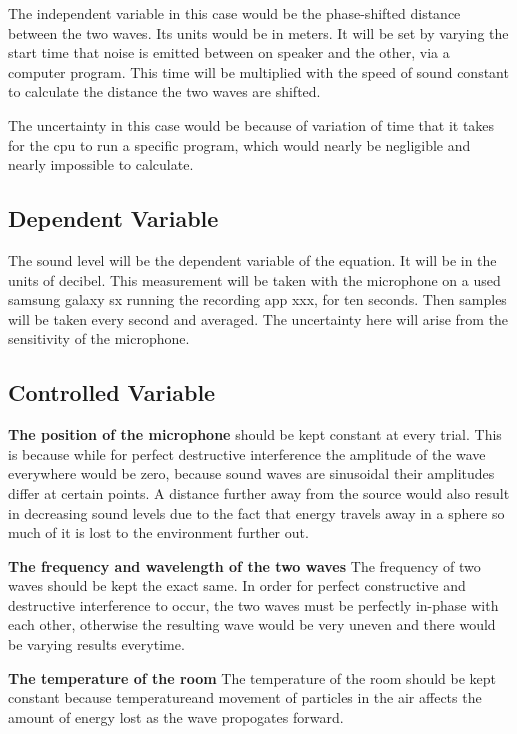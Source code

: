 \documentclass[index]{subfiles}
\begin{document}
The independent variable in this case would be the phase-shifted distance between the two waves. Its units would be in meters. It will be set by varying the start time that noise is emitted between on speaker and the other, via a computer program. This time will be multiplied with the speed of sound constant to calculate the distance the two waves are shifted.

The uncertainty in this case would be because of variation of time that it takes for the cpu to run a specific program, which would nearly be negligible and nearly impossible to calculate.

\subsection{Dependent Variable}

The sound level will be the dependent variable of the equation. It will be in the units of decibel. This measurement will be taken with the microphone on a used samsung galaxy sx running the recording app xxx, for ten seconds. Then samples will be taken every second and averaged. The uncertainty here will arise from the sensitivity of the microphone.

\subsection{Controlled Variable}

\textbf{The position of the microphone} should be kept constant at every trial. This is because while for perfect destructive interference the amplitude of the wave everywhere would be zero, because sound waves are sinusoidal their amplitudes differ at certain points. A distance further away from the source would also result in decreasing sound levels due to the fact that energy travels away in a sphere so much of it is lost to the environment further out.

\textbf{The frequency and wavelength of the two waves} The frequency of two waves should be kept the exact same. In order for perfect constructive and destructive interference to occur, the two waves must be perfectly in-phase with each other, otherwise the resulting wave would be very uneven and there would be varying results everytime.

\textbf{The temperature of the room} The temperature of the room should be kept constant because temperatureand movement of particles in the air affects the amount of energy lost as the wave propogates forward.
\end{document}
